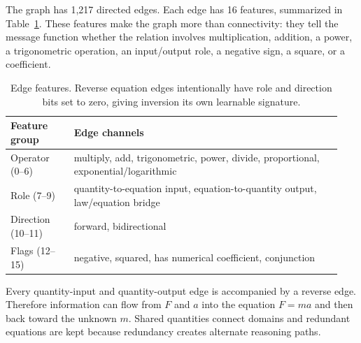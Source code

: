 \documentclass[10pt]{article}
\begin{document}
The graph has 1,217 directed edges. Each edge has 16 features, summarized in Table~\ref{tab:edgefeatures}. These features make the graph more than connectivity: they tell the message function whether the relation involves multiplication, addition, a power, a trigonometric operation, an input/output role, a negative sign, a square, or a coefficient.

\begin{table}[H]
\centering\small
\begin{tabular}{p{0.18\linewidth}p{0.76\linewidth}}
\toprule
Feature group & Edge channels\\
\midrule
Operator (0--6) & multiply, add, trigonometric, power, divide, proportional, exponential/logarithmic\\
Role (7--9) & quantity-to-equation input, equation-to-quantity output, law/equation bridge\\
Direction (10--11) & forward, bidirectional\\
Flags (12--15) & negative, squared, has numerical coefficient, conjunction\\
\bottomrule
\end{tabular}
\caption{Edge features. Reverse equation edges intentionally have role and direction bits set to zero, giving inversion its own learnable signature.}
\label{tab:edgefeatures}
\end{table}

Every quantity-input and quantity-output edge is accompanied by a reverse edge. Therefore information can flow from $F$ and $a$ into the equation $F=ma$ and then back toward the unknown $m$. Shared quantities connect domains and redundant equations are kept because redundancy creates alternate reasoning paths.
\end{document}
